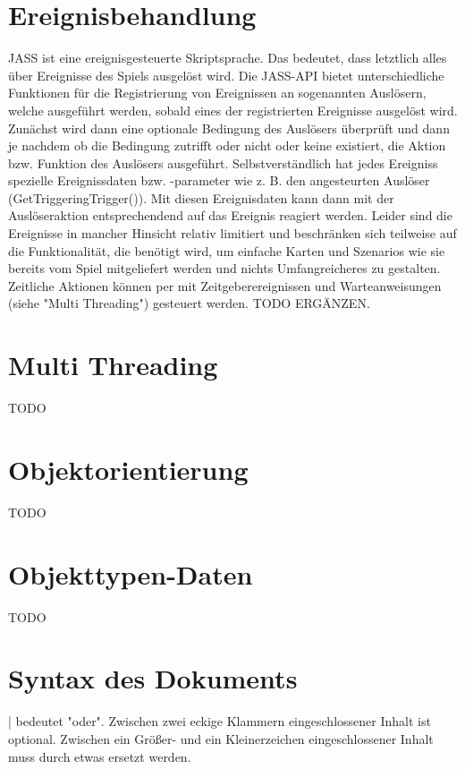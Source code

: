 \section{Ereignisbehandlung}
JASS ist eine ereignisgesteuerte Skriptsprache. Das bedeutet, dass letztlich alles über Ereignisse des Spiels ausgelöst wird. Die JASS-API bietet unterschiedliche
Funktionen für die Registrierung von Ereignissen an sogenannten Auslösern, welche ausgeführt werden, sobald eines der registrierten Ereignisse ausgelöst wird.
Zunächst wird dann eine optionale Bedingung des Auslösers überprüft und dann je nachdem ob die Bedingung zutrifft oder nicht oder keine existiert, die Aktion bzw.
Funktion des Auslösers ausgeführt. Selbstverständlich hat jedes Ereigniss spezielle Ereignissdaten bzw. -parameter wie z. B. den angesteurten Auslöser (GetTriggeringTrigger()).
Mit diesen Ereignisdaten kann dann mit der Auslöseraktion entsprechendend auf das Ereignis reagiert werden. Leider sind die Ereignisse in mancher Hinsicht relativ limitiert
und beschränken sich teilweise auf die Funktionalität, die benötigt wird, um einfache Karten und Szenarios wie sie bereits vom Spiel mitgeliefert werden und nichts Umfangreicheres
zu gestalten.
Zeitliche Aktionen können per mit Zeitgeberereignissen und Warteanweisungen (siehe "Multi Threading") gesteuert werden.
TODO ERGÄNZEN.

\section{Multi Threading}
TODO

\section{Objektorientierung}
TODO

\section{Objekttypen-Daten}
TODO

\section{Syntax des Dokuments}
| bedeutet "oder".
Zwischen zwei eckige Klammern eingeschlossener Inhalt ist optional.
Zwischen ein Größer- und ein Kleinerzeichen eingeschlossener Inhalt muss durch etwas ersetzt werden.
